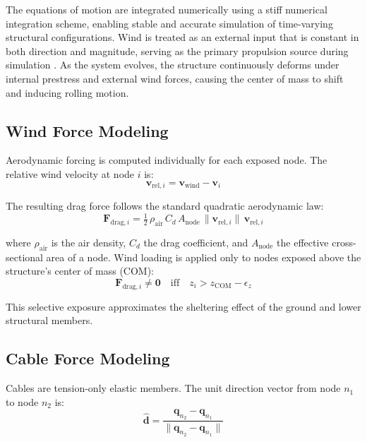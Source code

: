\documentclass[conference]{IEEEtran}
\begin{document}
The equations of motion are integrated numerically using a stiff numerical
integration scheme, enabling stable and accurate simulation of time-varying
structural configurations. Wind is treated as an external input that is
constant in both direction and magnitude, serving as the primary propulsion
source during simulation \cite{b12}. As the system evolves, the structure
continuously deforms under internal prestress and external wind forces, causing
the center of mass to shift and inducing rolling motion.

\subsection{Wind Force Modeling}

Aerodynamic forcing is computed individually for each exposed node. The
relative wind velocity at node $i$ is:
%
\begin{equation}
\label{eq:v_rel}
\mathbf{v}_{\mathrm{rel},i} = \mathbf{v}_{\mathrm{wind}} - \mathbf{v}_i
\end{equation}

The resulting drag force follows the standard quadratic aerodynamic law:
%
\begin{equation}
\label{eq:wind_force}
\mathbf{F}_{\mathrm{drag},i} = \tfrac{1}{2}\,\rho_{\mathrm{air}}\,C_d\,
A_{\mathrm{node}}\,\|\mathbf{v}_{\mathrm{rel},i}\|\,\mathbf{v}_{\mathrm{rel},i}
\end{equation}

where $\rho_{\mathrm{air}}$ is the air density, $C_d$ the drag coefficient, and
$A_{\mathrm{node}}$ the effective cross-sectional area of a node. Wind loading
is applied only to nodes exposed above the structure's center of mass (COM):
%
\begin{equation}
\label{eq:wind_condition}
\mathbf{F}_{\mathrm{drag},i} \neq \mathbf{0} \quad
\text{iff} \quad z_i > z_{\mathrm{COM}} - \epsilon_z
\end{equation}

This selective exposure approximates the sheltering effect of the ground and
lower structural members.

\subsection{Cable Force Modeling}

Cables are tension-only elastic members. The unit direction vector from node
$n_1$ to node $n_2$ is:
%
\begin{equation}
\label{eq:cable_dir}
\hat{\mathbf{d}} = \frac{\mathbf{q}_{n_2} - \mathbf{q}_{n_1}}
{\|\mathbf{q}_{n_2} - \mathbf{q}_{n_1}\|}
\end{equation}
\end{document}
